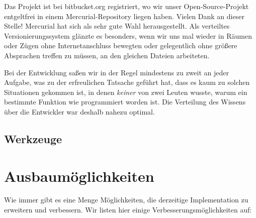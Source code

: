 \documentclass[ngerman]{article}
\begin{document}
Das Projekt ist bei bitbucket.org registriert, wo wir unser Open-Source-Projekt
entgeltfrei in einem Mercurial-Repository liegen haben. Vielen Dank an dieser Stelle!
Mercurial hat sich als sehr gute Wahl herausgestellt. Als verteiltes Versionierungssystem
glänzte es besonders, wenn wir uns mal wieder in Räumen oder Zügen ohne Internetanschluss
bewegten oder gelegentlich ohne größere Absprachen treffen zu müssen, an den gleichen Dateien
arbeiteten.

Bei der Entwicklung saßen wir in der Regel mindestens zu zweit an jeder Aufgabe, 
was zu der erfreulichen Tatsache geführt hat, dass es kaum zu solchen Situationen
gekommen ist, in denen \textit{keiner} von zwei Leuten wusste, warum ein bestimmte Funktion wie
programmiert worden ist. Die Verteilung des Wissens über die Entwickler war deshalb 
nahezu optimal.

\subsection{Werkzeuge}

\section{Ausbaumöglichkeiten}

Wie immer gibt es eine Menge Möglichkeiten, die derzeitige Implementation zu erweitern 
und verbessern. Wir listen hier einige Verbesserungsmöglichkeiten auf:
\end{document}
